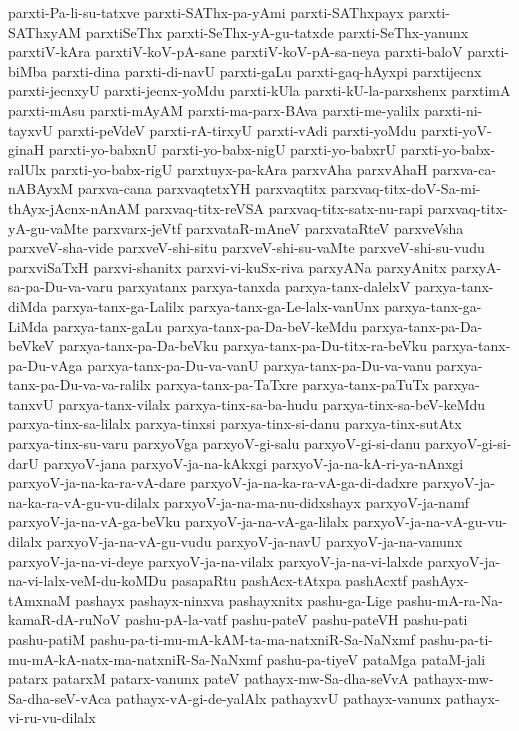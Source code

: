 {parxti-Pa-li-su-tatxve
parxti-SAThx-pa-yAmi
parxti-SAThxpayx
parxti-SAThxyAM
parxtiSeThx
parxti-SeThx-yA-gu-tatxde
parxti-SeThx-yanunx
parxtiV-kAra
parxtiV-koV-pA-sane
parxtiV-koV-pA-sa-neya
parxti-baloV
parxti-biMba
parxti-dina
parxti-di-navU
parxti-gaLu
parxti-gaq-hAyxpi
parxtijecnx
parxti-jecnxyU
parxti-jecnx-yoMdu
parxti-kUla
parxti-kU-la-parxshenx
parxtimA
parxti-mAsu
parxti-mAyAM
parxti-ma-parx-BAva
parxti-me-yalilx
parxti-ni-tayxvU
parxti-peVdeV
parxti-rA-tirxyU
parxti-vAdi
parxti-yoMdu
parxti-yoV-ginaH
parxti-yo-babxnU
parxti-yo-babx-nigU
parxti-yo-babxrU
parxti-yo-babx-ralUlx
parxti-yo-babx-rigU
parxtuyx-pa-kAra
parxvAha
parxvAhaH
parxva-ca-nABAyxM
parxva-cana
parxvaqtetxYH
parxvaqtitx
parxvaq-titx-doV-Sa-mi-thAyx-jAcnx-nAnAM
parxvaq-titx-reVSA
parxvaq-titx-satx-nu-rapi
parxvaq-titx-yA-gu-vaMte
parxvarx-jeVtf
parxvataR-mAneV
parxvataRteV
parxveVsha
parxveV-sha-vide
parxveV-shi-situ
parxveV-shi-su-vaMte
parxveV-shi-su-vudu
parxviSaTxH
parxvi-shanitx
parxvi-vi-kuSx-riva
parxyANa
parxyAnitx
parxyA-sa-pa-Du-va-varu
parxyatanx
parxya-tanxda
parxya-tanx-dalelxV
parxya-tanx-diMda
parxya-tanx-ga-Lalilx
parxya-tanx-ga-Le-lalx-vanUnx
parxya-tanx-ga-LiMda
parxya-tanx-gaLu
parxya-tanx-pa-Da-beV-keMdu
parxya-tanx-pa-Da-beVkeV
parxya-tanx-pa-Da-beVku
parxya-tanx-pa-Du-titx-ra-beVku
parxya-tanx-pa-Du-vAga
parxya-tanx-pa-Du-va-vanU
parxya-tanx-pa-Du-va-vanu
parxya-tanx-pa-Du-va-va-ralilx
parxya-tanx-pa-TaTxre
parxya-tanx-paTuTx
parxya-tanxvU
parxya-tanx-vilalx
parxya-tinx-sa-ba-hudu
parxya-tinx-sa-beV-keMdu
parxya-tinx-sa-lilalx
parxya-tinxsi
parxya-tinx-si-danu
parxya-tinx-sutAtx
parxya-tinx-su-varu
parxyoVga
parxyoV-gi-salu
parxyoV-gi-si-danu
parxyoV-gi-si-darU
parxyoV-jana
parxyoV-ja-na-kAkxgi
parxyoV-ja-na-kA-ri-ya-nAnxgi
parxyoV-ja-na-ka-ra-vA-dare
parxyoV-ja-na-ka-ra-vA-ga-di-dadxre
parxyoV-ja-na-ka-ra-vA-gu-vu-dilalx
parxyoV-ja-na-ma-nu-didxshayx
parxyoV-ja-namf
parxyoV-ja-na-vA-ga-beVku
parxyoV-ja-na-vA-ga-lilalx
parxyoV-ja-na-vA-gu-vu-dilalx
parxyoV-ja-na-vA-gu-vudu
parxyoV-ja-navU
parxyoV-ja-na-vanunx
parxyoV-ja-na-vi-deye
parxyoV-ja-na-vilalx
parxyoV-ja-na-vi-lalxde
parxyoV-ja-na-vi-lalx-veM-du-koMDu
pasapaRtu
pashAcx-tAtxpa
pashAcxtf
pashAyx-tAmxnaM
pashayx
pashayx-ninxva
pashayxnitx
pashu-ga-Lige
pashu-mA-ra-Na-kamaR-dA-ruNoV
pashu-pA-la-vatf
pashu-pateV
pashu-pateVH
pashu-pati
pashu-patiM
pashu-pa-ti-mu-mA-kAM-ta-ma-natxniR-Sa-NaNxmf
pashu-pa-ti-mu-mA-kA-natx-ma-natxniR-Sa-NaNxmf
pashu-pa-tiyeV
pataMga
pataM-jali
patarx
patarxM
patarx-vanunx
pateV
pathayx-mw-Sa-dha-seVvA
pathayx-mw-Sa-dha-seV-vAca
pathayx-vA-gi-de-yalAlx
pathayxvU
pathayx-vanunx
pathayx-vi-ru-vu-dilalx
}
